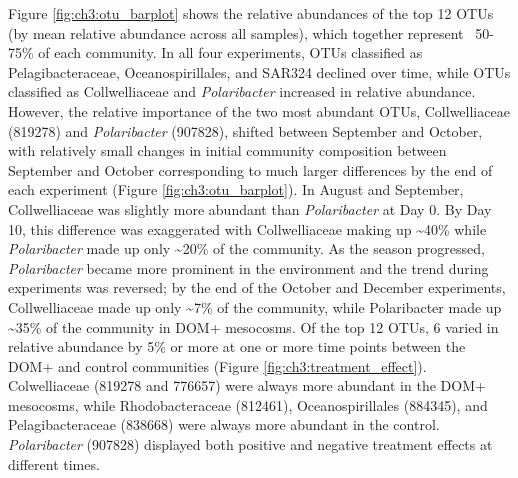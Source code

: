 Figure \ref{fig:ch3:otu_barplot}  shows the relative abundances of the top 12 OTUs (by mean relative abundance across all samples), which together represent ~50-75\% of each community. In all four experiments, OTUs classified as Pelagibacteraceae, Oceanospirillales, and SAR324 declined over time, while OTUs classified as Collwelliaceae and \emph{Polaribacter} increased in relative abundance. However, the relative importance of the two most abundant OTUs, Collwelliaceae (819278) and \emph{Polaribacter} (907828), shifted between September and October, with relatively small changes in initial community composition between September and October corresponding to much larger differences by the end of each experiment (Figure \ref{fig:ch3:otu_barplot}). In August and September, Collwelliaceae was slightly more abundant than \emph{Polaribacter} at Day 0. By Day 10, this difference was exaggerated with Collwelliaceae making up \textasciitilde{}40\% while \emph{Polaribacter} made up only \textasciitilde{}20\% of the community. As the season progressed, \emph{Polaribacter} became more prominent in the environment and the trend during experiments was reversed; by the end of the October and December experiments, Collwelliaceae made up only \textasciitilde{}7\% of the community, while Polaribacter made up \textasciitilde{}35\% of the community in DOM+ mesocosms. Of the top 12 OTUs, 6 varied in relative abundance by 5\% or more at one or more time points between the DOM+ and control communities (Figure \ref{fig:ch3:treatment_effect}). Colwelliaceae (819278 and 776657) were always more abundant in the DOM+ mesocosms, while Rhodobacteraceae (812461), Oceanospirillales (884345), and Pelagibacteraceae (838668) were always more abundant in the control. \emph{Polaribacter} (907828) displayed both positive and negative treatment effects at different times. 

